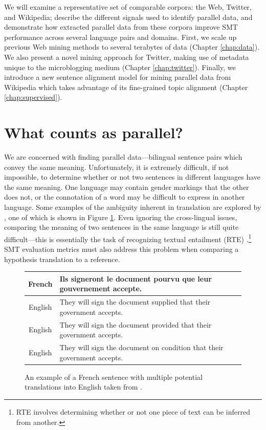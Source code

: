 We will examine a representative set of comparable corpora: the Web, Twitter,
and Wikipedia; describe the different signals used to identify parallel data,
and demonstrate how extracted parallel data from these corpora improve SMT
performance across several language pairs and domains. First, we scale up
previous Web mining methods \citep{Resnik03} to several terabytes of data
(Chapter \ref{chap:data}). We
also present a novel mining approach for Twitter, making use of metadata unique
to the microblogging medium (Chapter \ref{chap:twitter}). Finally, we introduce a new sentence alignment
model for mining parallel data from Wikipedia which takes advantage of its
fine-grained topic alignment (Chapter \ref{chap:supervised}).

\section{What counts as parallel?}
\label{sec:what_is_parallel}
We are concerned with finding parallel data---bilingual sentence pairs
which convey the same meaning. Unfortunately, it is extremely difficult, if not
impossible, to determine whether or not two sentences in different languages
have the same meaning. One language may contain gender markings that the other
does not, or the connotation of a word may be difficult to express in another
language. Some examples of the ambiguity inherent in translation are explored by
\citet{Kay97}, one of which is shown in Figure \ref{fig:kay_ambig}.
Even ignoring the cross-lingual issues, comparing the meaning of two sentences
in the same language is still quite difficult---this is essentially the task of recognizing textual
entailment (RTE) \citep{Dagan10}.\footnote{RTE involves determining whether or
not one piece of text can be inferred from another.}
SMT evaluation metrics
\citep{Papineni02,Banerjee05,Snover06} must also address this problem when
comparing a hypothesis translation to a reference.

\begin{figure}[ht]
\begin{tabular}{|c|l|}
\hline
French & Ils signeront le document pourvu que leur gouvernement accepte.\\
\hline
English & They will sign the document supplied that their government accepts. \\
English & They will sign the document provided that their government accepts. \\
English & They will sign the document on condition that their government accepts.\\
\hline
\end{tabular}
\caption{An example of a French sentence with multiple potential translations
into English taken from \citet{Kay97}.}
\label{fig:kay_ambig}
\end{figure}

